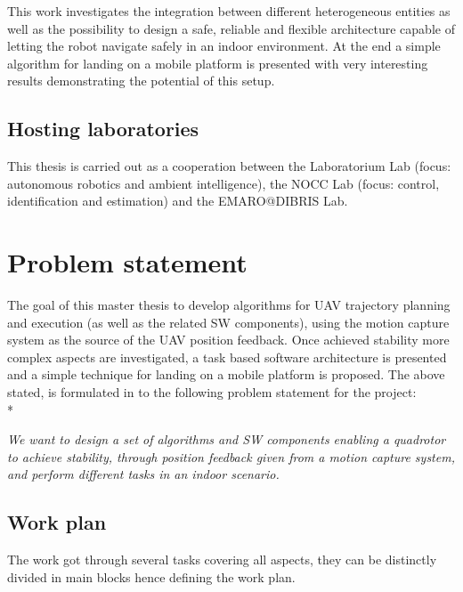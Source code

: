 This work investigates the integration between different heterogeneous entities as well as the possibility to design a safe, reliable and flexible architecture capable of letting the robot navigate safely in an indoor environment. At the end a simple algorithm for landing on a mobile platform is presented with very interesting results demonstrating the potential of this setup.

\subsection{Hosting laboratories}
This thesis is carried out as a cooperation between the Laboratorium Lab (focus:
autonomous robotics and ambient intelligence), the NOCC Lab (focus: control,
identification and estimation) and the EMARO@DIBRIS Lab.

\newpage

\section{Problem statement}

The goal of this master thesis to develop algorithms for UAV trajectory planning and execution (as well as the related SW components), using the motion capture system as the source of the UAV position feedback. Once achieved stability more complex aspects are investigated, a task based software architecture is presented and a simple technique for landing on a mobile platform is proposed.
The above stated, is formulated in to the following problem statement for the project: \\*

\noindent
\textit{We want to design a set of algorithms and SW components enabling a quadrotor to achieve stability, through position feedback given from a motion capture system, and perform different tasks in an indoor scenario. }

\subsection{Work plan}
The work got through several tasks covering all aspects, they can be distinctly divided in main blocks hence defining the work plan.

